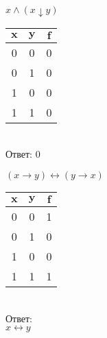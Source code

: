     \begin{minipage}[t]{0.31\textwidth}
        \begin{enumerate}
            \setcounter{enumi}{2}
            \begin{spacing}{0.5}
                \item $x \wedge (x \downarrow y)$\\
            \end{spacing}
            \begin{tabular}{|c|c|c|}
                \hline
                $\textbf{x}$ & $\textbf{y}$ & $\textbf{f}$ \\
                \hline
                \hline
                0            & 0            & 0            \\
                \hline
                0            & 1            & 0            \\
                \hline
                1            & 0            & 0            \\
                \hline
                1            & 1            & 0            \\
                \hline
            \end{tabular}\\
            Ответ: 0
            \begin{spacing}{1.52}
                \begin{center}\end{center}
            \end{spacing}
            \setcounter{enumi}{6}
            \begin{spacing}{0.5}
                \item $(x \rightarrow y) \leftrightarrow (y \rightarrow x)$\\
            \end{spacing}
            \begin{tabular}{|c|c|c|}
                \hline
                $\textbf{x}$ & $\textbf{y}$ & $\textbf{f}$ \\
                \hline
                \hline
                0            & 0            & 1            \\
                \hline
                0            & 1            & 0            \\
                \hline
                1            & 0            & 0            \\
                \hline
                1            & 1            & 1            \\
                \hline
            \end{tabular}\\
            Ответ:\\
            $x \leftrightarrow y$
        \end{enumerate}
    \end{minipage}
